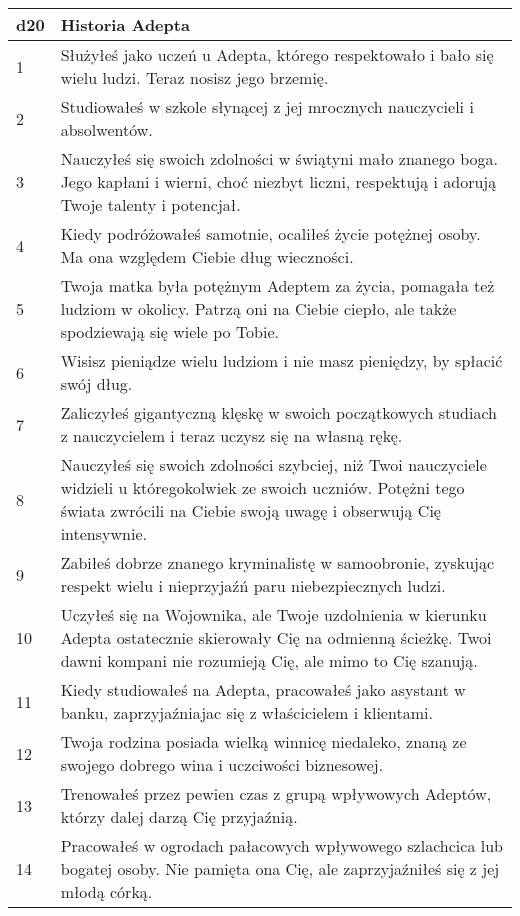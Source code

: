  \begin{table*}[t]
 \centering
 \begin{tabularx}{\textwidth}{| p{} | X |}
  \hline
  \textbf{d20} & \textbf{Historia Adepta}  \\ \hline
    1 & Służyłeś jako uczeń u Adepta, którego respektowało i bało się wielu ludzi. Teraz nosisz jego brzemię. \\ \hline
    2 & Studiowałeś w szkole słynącej z jej mrocznych nauczycieli i absolwentów. \\ \hline
    3 & Nauczyłeś się swoich zdolności w świątyni mało znanego boga. Jego kapłani i wierni, choć niezbyt liczni, respektują i adorują Twoje talenty i potencjał. \\ \hline
    4 & Kiedy podróżowałeś samotnie, ocaliłeś życie potężnej osoby. Ma ona względem Ciebie dług wieczności. \\ \hline
    5 & Twoja matka była potężnym Adeptem za życia, pomagała też ludziom w okolicy. Patrzą oni na Ciebie ciepło, ale także spodziewają się wiele po Tobie. \\ \hline
    6 & Wisisz pieniądze wielu ludziom i nie masz pieniędzy, by spłacić swój dług. \\ \hline
    7 & Zaliczyłeś gigantyczną klęskę w swoich początkowych studiach z nauczycielem i teraz uczysz się na własną rękę. \\ \hline
    8 & Nauczyłeś się swoich zdolności szybciej, niż Twoi nauczyciele widzieli u któregokolwiek ze swoich uczniów. Potężni tego świata zwrócili na Ciebie swoją uwagę i obserwują Cię intensywnie.  \\ \hline
    9 & Zabiłeś dobrze znanego kryminalistę w samoobronie, zyskując respekt wielu i nieprzyjaźń paru niebezpiecznych ludzi. \\ \hline
    10 & Uczyłeś się na Wojownika, ale Twoje uzdolnienia w kierunku Adepta ostatecznie skierowały Cię na odmienną ścieżkę. Twoi dawni kompani nie rozumieją Cię, ale mimo to Cię szanują. \\ \hline
    11 & Kiedy studiowałeś na Adepta, pracowałeś jako asystant w banku, zaprzyjaźniajac się z właścicielem i klientami. \\ \hline
    12 & Twoja rodzina posiada wielką winnicę niedaleko, znaną ze swojego dobrego wina i uczciwości biznesowej. \\ \hline
    13 & Trenowałeś przez pewien czas z grupą wpływowych Adeptów, którzy dalej darzą Cię przyjaźnią. \\ \hline
    14 & Pracowałeś w ogrodach pałacowych wpływowego szlachcica lub bogatej osoby. Nie pamięta ona Cię, ale zaprzyjaźniłeś się z jej młodą córką. \\ \hline

\end{tabularx}
\end{table*}
